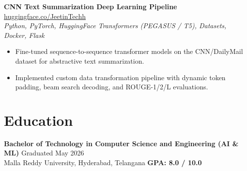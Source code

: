 \documentclass[10pt]{article}
\newcommand{\educationSection}{
\section*{Education}
\textbf{Bachelor of Technology in Computer Science and Engineering (AI \& ML)} \hfill Graduated May 2026 \\
Malla Reddy University, Hyderabad, Telangana \hfill \textbf{GPA: 8.0 / 10.0}
}
\begin{document}
\vspace{1.5pt}
\textbf{CNN Text Summarization Deep Learning Pipeline} \hfill \href{https://huggingface.co/JeetinTechh/CNN-News-data}{huggingface.co/JeetinTechh} \\
\textit{Python, PyTorch, HuggingFace Transformers (PEGASUS / T5), Datasets, Docker, Flask}
\begin{itemize}
    \item Fine-tuned sequence-to-sequence transformer models on the CNN/DailyMail dataset for abstractive text summarization.
    \item Implemented custom data transformation pipeline with dynamic token padding, beam search decoding, and ROUGE-1/2/L evaluations.
\end{itemize}

\educationSection
\end{document}
